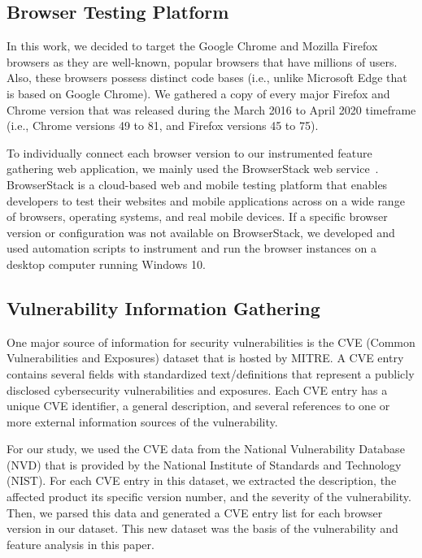 

\subsection{Browser Testing Platform}

In this work, we decided to target the Google Chrome and Mozilla
Firefox browsers as they are well-known, popular browsers that have
millions of users. Also, these browsers possess distinct code bases
(i.e., unlike Microsoft Edge that is based on Google Chrome). We
gathered a copy of every major Firefox and Chrome version that was
released during the March 2016 to April 2020 timeframe (i.e., Chrome
versions 49 to 81, and Firefox versions 45 to 75).

To individually connect each browser version to our instrumented
feature gathering web application, we mainly used the BrowserStack web
service~\cite{browserstack}. BrowserStack is a cloud-based web and mobile testing platform
that enables developers to test their websites and mobile applications
across on a wide range of browsers, operating systems, and real mobile
devices. If a specific browser version or configuration was not
available on BrowserStack, we developed and used automation scripts to
instrument and run the browser instances on a desktop computer running
Windows 10.

\subsection{Vulnerability Information Gathering}

One major source of information for security vulnerabilities is the
CVE (Common Vulnerabilities and Exposures) dataset that is hosted by
MITRE. A CVE entry contains several fields with standardized
text/definitions that represent a publicly disclosed cybersecurity
vulnerabilities and exposures. Each CVE entry has a unique CVE
identifier, a general description, and several references to one or
more external information sources of the vulnerability.

For our study, we used the CVE data from the National Vulnerability
Database (NVD) that is provided by the National Institute of Standards
and Technology (NIST). For each CVE entry in this dataset, we
extracted the description, the affected product its specific version
number, and the severity of the vulnerability. Then, we parsed this
data and generated a CVE entry list for each browser version in our
dataset. This new dataset was the basis of the vulnerability and
feature analysis in this paper.
